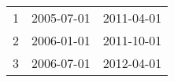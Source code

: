 % 
\begin{tabular}{ccc}
  \hline
  \hline
1 & 2005-07-01 & 2011-04-01 \\ 
  2 & 2006-01-01 & 2011-10-01 \\ 
  3 & 2006-07-01 & 2012-04-01 \\ 
   \hline
\end{tabular}
